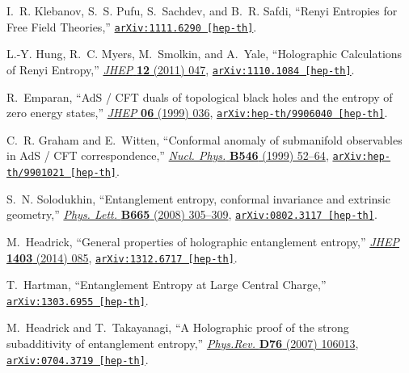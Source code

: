 \begin{thebibliography}{100}
I.~R. Klebanov, S.~S. Pufu, S.~Sachdev, and B.~R. Safdi, ``{Renyi Entropies for
  Free Field Theories},''
\href{http://arxiv.org/abs/1111.6290}{{\tt arXiv:1111.6290 [hep-th]}}.

L.-Y. Hung, R.~C. Myers, M.~Smolkin, and A.~Yale, ``{Holographic Calculations
  of Renyi Entropy},'' \href{http://dx.doi.org/10.1007/JHEP12(2011)047}{{\em
  JHEP} {\bf 12} (2011)  047},
\href{http://arxiv.org/abs/1110.1084}{{\tt arXiv:1110.1084 [hep-th]}}.

R.~Emparan, ``{AdS / CFT duals of topological black holes and the entropy of
  zero energy states},''
  \href{http://dx.doi.org/10.1088/1126-6708/1999/06/036}{{\em JHEP} {\bf 06}
  (1999)  036},
\href{http://arxiv.org/abs/hep-th/9906040}{{\tt arXiv:hep-th/9906040
  [hep-th]}}.

C.~R. Graham and E.~Witten, ``{Conformal anomaly of submanifold observables in
  AdS / CFT correspondence},''
  \href{http://dx.doi.org/10.1016/S0550-3213(99)00055-3}{{\em Nucl. Phys.} {\bf
  B546} (1999)  52--64},
\href{http://arxiv.org/abs/hep-th/9901021}{{\tt arXiv:hep-th/9901021
  [hep-th]}}.

S.~N. Solodukhin, ``{Entanglement entropy, conformal invariance and extrinsic
  geometry},'' \href{http://dx.doi.org/10.1016/j.physletb.2008.05.071}{{\em
  Phys. Lett.} {\bf B665} (2008)  305--309},
\href{http://arxiv.org/abs/0802.3117}{{\tt arXiv:0802.3117 [hep-th]}}.

M.~Headrick, ``{General properties of holographic entanglement entropy},''
  \href{http://dx.doi.org/10.1007/JHEP03(2014)085}{{\em JHEP} {\bf 1403} (2014)
   085},
\href{http://arxiv.org/abs/1312.6717}{{\tt arXiv:1312.6717 [hep-th]}}.

T.~Hartman, ``{Entanglement Entropy at Large Central Charge},''
\href{http://arxiv.org/abs/1303.6955}{{\tt arXiv:1303.6955 [hep-th]}}.

M.~Headrick and T.~Takayanagi, ``{A Holographic proof of the strong
  subadditivity of entanglement entropy},''
  \href{http://dx.doi.org/10.1103/PhysRevD.76.106013}{{\em Phys.Rev.} {\bf D76}
  (2007)  106013},
\href{http://arxiv.org/abs/0704.3719}{{\tt arXiv:0704.3719 [hep-th]}}.


\end{thebibliography}
